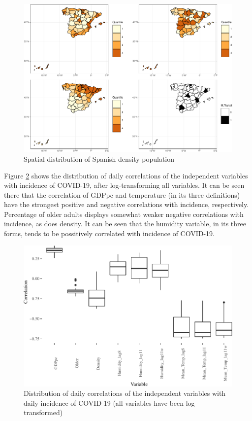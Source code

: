 \documentclass[]{elsarticle} %
\makeatletter
\def\maxwidth{\ifdim\Gin@nat@width>\linewidth\linewidth
\else\Gin@nat@width\fi}
\let\Oldincludegraphics\includegraphics
\renewcommand{\includegraphics}[1]{\Oldincludegraphics[width=\maxwidth]{#1}}
\makeatother
\begin{document}
\begin{figure}
\centering
\includegraphics{Environmental-Correlates-of-COVID19-Spain_files/figure-latex/plotfer1-1.pdf}
\caption{\label{Fig-quantile} Spatial distribution of Spanish density
population}
\end{figure}

Figure \ref{fig:daily-correlations} shows the distribution of daily
correlations of the independent variables with incidence of COVID-19,
after log-transforming all variables. It can be seen there that the
correlation of GDPpc and temperature (in its three definitions) have the
strongest positive and negative correlations with incidence,
respectively. Percentage of older adults displays somewhat weaker
negative correlations with incidence, as does density. It can be seen
that the humidity variable, in its three forms, tends to be possitively
correlated with incidence of COVID-19.

\begin{figure}
\centering
\includegraphics{Environmental-Correlates-of-COVID19-Spain_files/figure-latex/daily-correlations-1.pdf}
\caption{\label{fig:daily-correlations}Distribution of daily
correlations of the independent variables with daily incidence of
COVID-19 (all variables have been log-transformed)}
\end{figure}
\end{document}
